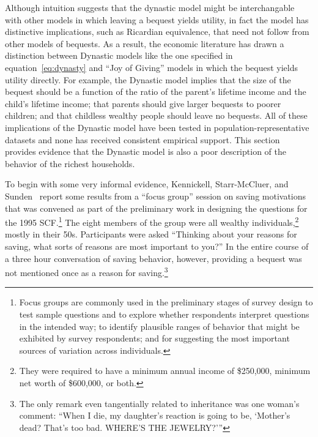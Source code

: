 \documentclass[titlepage,12pt]{article}
\begin{document}
Although intuition suggests that the dynastic model might be 
interchangable with other models in which leaving a bequest yields 
utility, in fact the model has distinctive implications, such as 
Ricardian equivalence, that need not follow from other models of 
bequests.  As a result, the economic literature has drawn a 
distinction between Dynastic models like the one specified in 
equation~\ref{eq:dynasty} and ``Joy of Giving'' models in which the 
bequest yields utility directly.  For example, the Dynastic model 
implies that the size of the bequest should be a function of the ratio 
of the parent's lifetime income and the child's lifetime income; that 
parents should give larger bequests to poorer children; and that 
childless wealthy people should leave no bequests.  All of these 
implications of the Dynastic model have been tested in 
population-representative datasets and none has received consistent 
empirical support.  This section provides evidence that the Dynastic 
model is also a poor description of the behavior of the richest 
households.

To begin with some very informal evidence, Kennickell, Starr-McCluer, 
and Sunden~\cite{scf:focusgroup} report some results from a ``focus 
group'' session on saving motivations that was convened as part of the 
preliminary work in designing the questions for the 1995 
SCF.\footnote{Focus groups are commonly used in the preliminary stages 
of survey design to test sample questions and to explore whether 
respondents interpret questions in the intended way; to identify 
plausible ranges of behavior that might be exhibited by survey 
respondents; and for suggesting the most important sources of 
variation across individuals.} The eight members of the group were all 
wealthy individuals,\footnote{They were required to have a minimum 
annual income of \$250,000, minimum net worth of \$600,000, or both.} 
mostly in their 50s.  Participants were asked ``Thinking about your 
reasons for saving, what sorts of reasons are most important to you?''  
In the entire course of a three hour conversation of saving behavior, 
however, providing a bequest was not mentioned once as a reason for 
saving.\footnote{The only remark even tangentially related to 
inheritance was one woman's comment: ``When I die, my daughter's 
reaction is going to be, `Mother's dead?  That's too bad.  WHERE'S THE 
JEWELRY?'''}
\end{document}
